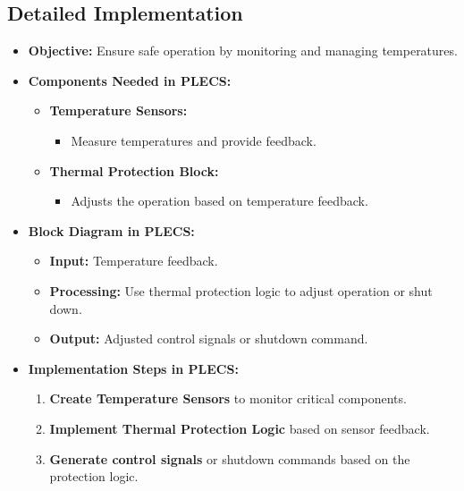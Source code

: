 \documentclass{article}
\begin{document}
\subsection{Detailed Implementation}
\begin{itemize}
    \item \textbf{Objective:} Ensure safe operation by monitoring and managing temperatures.
    \item \textbf{Components Needed in PLECS:}
    \begin{itemize}
        \item \textbf{Temperature Sensors:}
        \begin{itemize}
            \item Measure temperatures and provide feedback.
        \end{itemize}
        \item \textbf{Thermal Protection Block:}
        \begin{itemize}
            \item Adjusts the operation based on temperature feedback.
        \end{itemize}
    \end{itemize}
    \item \textbf{Block Diagram in PLECS:}
    \begin{itemize}
        \item \textbf{Input:} Temperature feedback.
        \item \textbf{Processing:} Use thermal protection logic to adjust operation or shut down.
        \item \textbf{Output:} Adjusted control signals or shutdown command.
    \end{itemize}
    \item \textbf{Implementation Steps in PLECS:}
    \begin{enumerate}
        \item \textbf{Create Temperature Sensors} to monitor critical components.
        \item \textbf{Implement Thermal Protection Logic} based on sensor feedback.
        \item \textbf{Generate control signals} or shutdown commands based on the protection logic.
    \end{enumerate}
\end{itemize}
\end{document}

